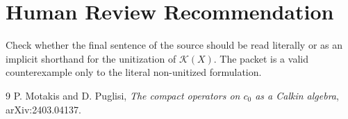 \documentclass[11pt]{amsart}
\begin{document}
\section*{Human Review Recommendation}

Check whether the final sentence of the source should be read literally or as
an implicit shorthand for the unitization of \(\mathcal K(X)\). The packet is a
valid counterexample only to the literal non-unitized formulation.

\begin{thebibliography}{9}
P. Motakis and D. Puglisi,
\emph{The compact operators on \(c_0\) as a Calkin algebra},
arXiv:2403.04137.
\end{thebibliography}
\end{document}
